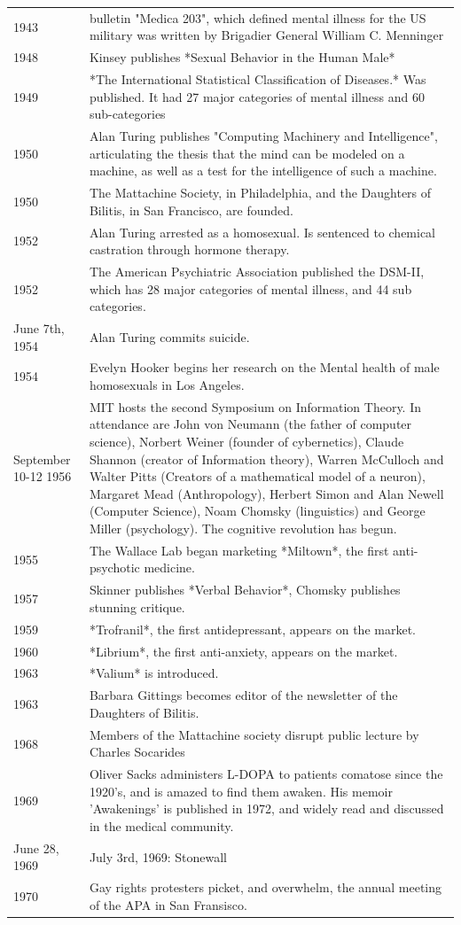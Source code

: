 \begin{longtable}[!t]{ | P{2cm} | P{11.8cm} | }
1943&bulletin "Medica 203", which defined mental illness for the US military was written by Brigadier General William C. Menninger \\
1948&Kinsey publishes *Sexual Behavior in the Human Male* \\
1949&*The International Statistical Classification of Diseases.* Was published. It had 27 major categories of mental illness and 60 sub-categories \\
1950&Alan Turing publishes "Computing Machinery and Intelligence", articulating the thesis that the mind can be modeled on a machine, as well as a test for the intelligence of such a machine. \\
1950&The Mattachine Society, in Philadelphia, and the Daughters of Bilitis, in San Francisco, are founded. \\
1952&Alan Turing arrested as a homosexual. Is sentenced to chemical castration through hormone therapy. \\
1952&The American Psychiatric Association published the DSM-II, which has 28 major categories of mental illness, and 44 sub categories. \\
June 7th, 1954&Alan Turing commits suicide. \\
1954&Evelyn Hooker begins her research on the Mental health of male homosexuals in Los Angeles. \\
September 10-12 1956&MIT hosts the second Symposium on Information Theory. In attendance are John von Neumann (the father of computer science), Norbert Weiner (founder of cybernetics), Claude Shannon (creator of Information theory), Warren McCulloch and Walter Pitts (Creators of a mathematical model of a neuron), Margaret Mead (Anthropology), Herbert Simon and Alan Newell (Computer Science), Noam Chomsky (linguistics) and George Miller (psychology). The cognitive revolution has begun. \\
1955&The Wallace Lab began marketing *Miltown*, the first anti-psychotic medicine. \\
1957&Skinner publishes *Verbal Behavior*, Chomsky publishes stunning critique. \\
1959&*Trofranil*, the first antidepressant, appears on the market. \\
1960&*Librium*, the first anti-anxiety, appears on the market. \\
1963&*Valium* is introduced. \\
1963&Barbara Gittings becomes editor of the newsletter of the Daughters of Bilitis. \\
1968&Members of the Mattachine society disrupt public lecture by Charles Socarides \\
1969&Oliver Sacks administers L-DOPA to patients comatose since the 1920's, and is amazed to find them awaken. His memoir 'Awakenings' is published in 1972, and widely read and discussed in the medical community. \\
June 28, 1969&July 3rd, 1969: Stonewall \\
1970&Gay rights protesters picket, and overwhelm, the annual meeting of the APA in San Fransisco. \\ \hline \hline


\end{longtable}

